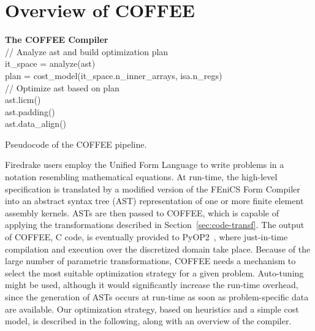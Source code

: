 \documentclass[conference]{IEEEtran}
\begin{document}

\section{Overview of COFFEE}
\label{sec:pyop2-compiler}

\begin{algorithm}[t]
\footnotesize
  \textbf{The COFFEE Compiler}\\
// Analyze ast and build optimization plan \\
it\_space = analyze(ast) \\
plan = cost\_model(it\_space.n\_inner\_arrays, isa.n\_regs) \\
// Optimize ast based on plan \\
ast.licm() \\
ast.padding() \\
ast.data\_align() \\
\caption{Pseudocode of the COFFEE pipeline.}
\label{algo:PyOP2Compiler}
\end{algorithm}


Firedrake users employ the Unified Form Language to write problems in a notation resembling mathematical equations. At run-time, the high-level specification is translated by a modified version of the FEniCS Form Compiler~\cite{FFC-Compiler} into an abstract syntax tree (AST) representation of one or more finite element assembly kernels. ASTs are then passed to COFFEE, which is capable of applying the transformations described in Section~\ref{sec:code-transf}. The output of COFFEE, C code, is eventually provided to PyOP2~\cite{pyop2isc}, where just-in-time compilation and execution over the discretized domain take place. Because of the large number of parametric transformations, COFFEE needs a mechanism to select the most suitable optimization strategy for a given problem. Auto-tuning might be used, although it would significantly increase the run-time overhead, since the generation of ASTs occurs at run-time as soon as problem-specific data are available. Our optimization strategy, based on heuristics and a simple cost model, is described in the following, along with an overview of the compiler.
\end{document}
